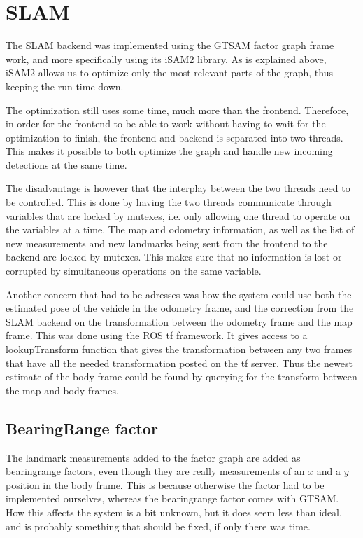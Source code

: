 \section{SLAM}

The SLAM backend was implemented using the GTSAM factor graph frame work\cite{GTSAM}, and more specifically using its iSAM2\cite{iSAM2} library. As is explained above, iSAM2 allows us to optimize only the most relevant parts of the graph, thus keeping the run time down. 

The optimization still uses some time, much more than the frontend. Therefore, in order for the frontend to be able to work without having to wait for the optimization to finish, the frontend and backend is separated into two threads. This makes it possible to both optimize the graph and handle new incoming detections at the same time. 

The disadvantage is however that the interplay between the two threads need to be controlled. This is done by having the two threads communicate through variables that are locked by mutexes, i.e. only allowing one thread to operate on the variables at a time. The map and odometry information, as well as the list of new measurements and new landmarks being sent from the frontend to the backend are locked by mutexes. This makes sure that no information is lost or corrupted by simultaneous operations on the same variable. 

Another concern that had to be adresses was how the system could use both the estimated pose of the vehicle in the odometry frame, and the correction from the SLAM backend on the transformation between the odometry frame and the map frame. This was done using the ROS tf framework. It gives access to a lookupTransform function that gives the transformation between any two frames that have all the needed transformation posted on the tf server. Thus the newest estimate of the body frame could be found by querying for the transform between the map and body frames. 

\subsection{BearingRange factor}

The landmark measurements added to the factor graph are added as bearingrange factors, even though they are really measurements of an $x$ and a $y$ position in the body frame. This is because otherwise the factor had to be implemented ourselves, whereas the bearingrange factor comes with GTSAM. How this affects the system is a bit unknown, but it does seem less than ideal, and is probably something that should be fixed, if only there was time.

